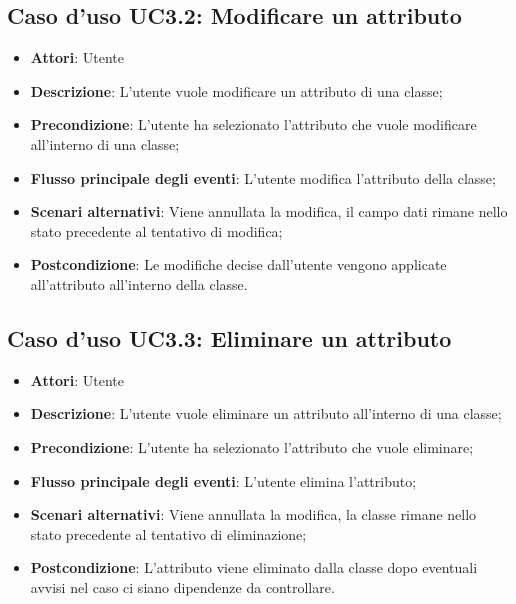 \documentclass[../AnalisiDeiRequisiti.tex]{subfiles}
\begin{document}
		\subsection{Caso d'uso UC3.2: Modificare un attributo}
		\begin{itemize}
			\item \textbf{Attori}: Utente
			\item \textbf{Descrizione}: L'utente vuole modificare un attributo di una classe;
			\item \textbf{Precondizione}: L'utente ha selezionato l'attributo che vuole modificare all'interno di una classe;
			\item \textbf{Flusso principale degli eventi}: L'utente modifica l'attributo della classe;
			\item \textbf{Scenari alternativi}: Viene annullata la modifica, il campo dati rimane nello stato precedente al tentativo di modifica;
			\item \textbf{Postcondizione}: Le modifiche decise dall'utente vengono applicate all'attributo all'interno della classe.
		\end{itemize}
		\subsection{Caso d'uso UC3.3: Eliminare un attributo}
		\begin{itemize}
			\item \textbf{Attori}: Utente
			\item \textbf{Descrizione}: L'utente vuole eliminare un attributo all'interno di una classe;
			\item \textbf{Precondizione}: L'utente ha selezionato l'attributo che vuole eliminare;
			\item \textbf{Flusso principale degli eventi}: L'utente elimina l'attributo;
			\item \textbf{Scenari alternativi}: Viene annullata la modifica, la classe rimane nello stato precedente al tentativo di eliminazione;
			\item \textbf{Postcondizione}: L'attributo viene eliminato dalla classe dopo eventuali avvisi nel caso ci siano dipendenze da controllare.
		\end{itemize}
\end{document}
